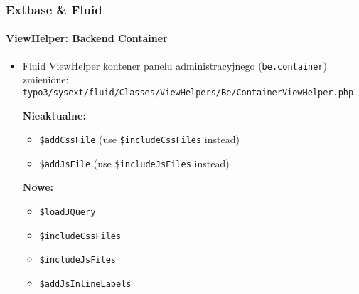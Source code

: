 
\begin{frame}[fragile]
	\frametitle{Extbase \& Fluid}
	\framesubtitle{ViewHelper: Backend Container}

	\lstset{
		basicstyle=\smaller\ttfamily
	}

	\begin{itemize}
		\item Fluid ViewHelper kontener panelu administracyjnego (\texttt{be.container}) zmienione:\newline
			\smaller\texttt{typo3/sysext/fluid/Classes/ViewHelpers/Be/ContainerViewHelper.php}\normalsize\newline

			\smaller\textbf{Nieaktualne:}\normalsize
			\begin{itemize}
				\item \texttt{\$addCssFile} (use \texttt{\$includeCssFiles} instead)
				\item \texttt{\$addJsFile} (use \texttt{\$includeJsFiles} instead)
			\end{itemize}

			\smaller\textbf{Nowe:}\normalsize
			\begin{itemize}
				\item \texttt{\$loadJQuery}
				\item \texttt{\$includeCssFiles}
				\item \texttt{\$includeJsFiles}
				\item \texttt{\$addJsInlineLabels}
			\end{itemize}

	\end{itemize}

\end{frame}


